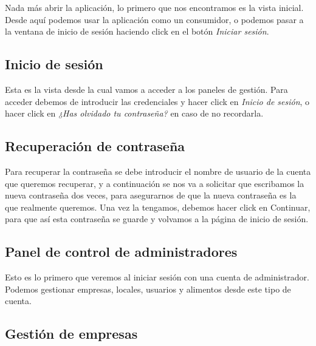 Nada más abrir la aplicación, lo primero que nos encontramos es la vista inicial. Desde aquí podemos usar la aplicación como un consumidor, o podemos pasar a la ventana de inicio de sesión haciendo click en el botón \textit{Iniciar sesión}.


\subsection{Inicio de sesión}

Esta es la vista desde la cual vamos a acceder a los paneles de gestión. Para acceder debemos de introducir las credenciales y hacer click en \textit{Inicio de sesión}, o hacer click en \textit{¿Has olvidado tu contraseña?} en caso de no recordarla.


\subsection{Recuperación de contraseña}

Para recuperar la contraseña se debe introducir el nombre de usuario de la cuenta que queremos recuperar, y a continuación se nos va a solicitar que escribamos la nueva contraseña dos veces, para asegurarnos de que la nueva contraseña es la que realmente queremos. Una vez la tengamos, debemos hacer click en Continuar, para que así esta contraseña se guarde y volvamos a la página de inicio de sesión.



\subsection{Panel de control de administradores}

Esto es lo primero que veremos al iniciar sesión con una cuenta de administrador. Podemos gestionar empresas, locales, usuarios y alimentos desde este tipo de cuenta.


\subsection{Gestión de empresas}

